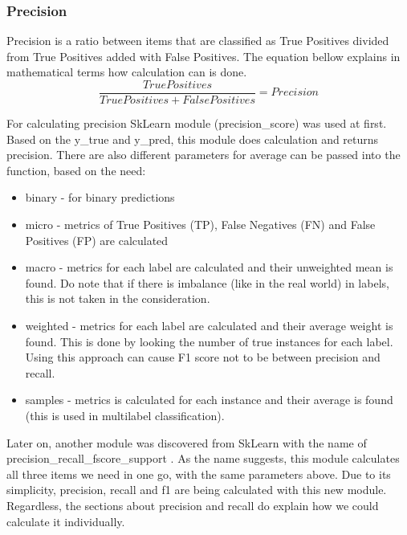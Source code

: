 \subsubsection{Precision}
Precision is a ratio between items that are classified as True Positives divided from True Positives added with False Positives. The equation bellow \parencite{davis2006relationship} explains in mathematical terms how calculation can is done.
\[\frac{True Positives }{True Positives + False Positives} = Precision \]

For calculating precision SkLearn module (precision{\_}score) was used \parencite{web:PrecisionScore} at first. Based on the y{\_}true and y{\_}pred, this module does calculation and returns precision. There are also different parameters for average can be passed into the function, based on the need:
\begin{itemize}
    \item binary - for binary predictions
    \item micro - metrics of True Positives (TP), False Negatives (FN) and False Positives (FP) are calculated
    \item macro - metrics for each label are calculated and their unweighted mean is found. Do note that if there is imbalance (like in the real world) in labels, this is not taken in the consideration.
    \item weighted - metrics for each label are calculated and their average weight is found. This is done by looking the number of true instances for each label. Using this approach can cause F1 score not to be between precision and recall.
    \item samples - metrics is calculated for each instance and their average is found (this is used in multilabel classification).
\end{itemize}

Later on, another module was discovered from SkLearn with the name of precision{\_}recall{\_}fscore{\_}support \parencite{web:PrecisionRecallFscoreSupport}. As the name suggests, this module calculates all three items we need in one go, with the same parameters above. Due to its simplicity, precision, recall and f1 are being calculated with this new module. Regardless, the sections about precision and recall do explain how we could calculate it individually.